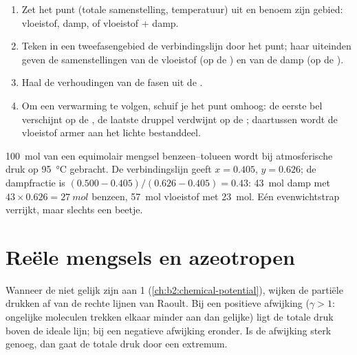 \begin{method}\label{met:b2:liquid-vapour-diagrams:read-diagram}
\begin{enumerate}
  \item Zet het punt (totale samenstelling, temperatuur) uit en benoem zijn
        gebied: vloeistof, damp, of vloeistof + damp.
  \item Teken in een tweefasengebied de verbindingslijn door het punt; haar uiteinden
        geven de samenstellingen van de vloeistof (op de ) en van de
        damp (op de ).
  \item Haal de verhoudingen van de fasen uit de .
  \item Om een verwarming te volgen, schuif je het punt omhoog: de eerste bel verschijnt
        op de , de laatste druppel verdwijnt op de ;
        daartussen wordt de vloeistof armer aan het lichte bestanddeel.
\end{enumerate}
\end{method}

\begin{example}\label{ex:b2:liquid-vapour-diagrams:flash}
\qty{100}{mol} van een equimolair mengsel benzeen--tolueen wordt bij atmosferische druk op
\qty{95}{\degreeCelsius} gebracht. De verbindingslijn geeft $x =
0.405$, $y = 0.626$; de dampfractie is $(0.500 - 0.405)/(0.626 - 0.405) =
0.43$: \qty{43}{mol} damp met $43 \times 0.626 = \qty{27}{mol}$
benzeen, \qty{57}{mol} vloeistof met \qty{23}{mol}. Eén evenwichtstrap
verrijkt, maar slechts een beetje.
\end{example}

\section{Reële mengsels en azeotropen}

Wanneer de  niet gelijk zijn aan 1 (\cref{ch:b2:chemical-potential}),
wijken de partiële drukken af van de rechte lijnen van Raoult. Bij een positieve
afwijking ($\gamma > 1$: ongelijke moleculen trekken elkaar minder aan dan gelijke)
ligt de totale druk boven de ideale lijn; bij een negatieve afwijking
eronder. Is de afwijking sterk genoeg, dan gaat de totale druk door een
extremum.

